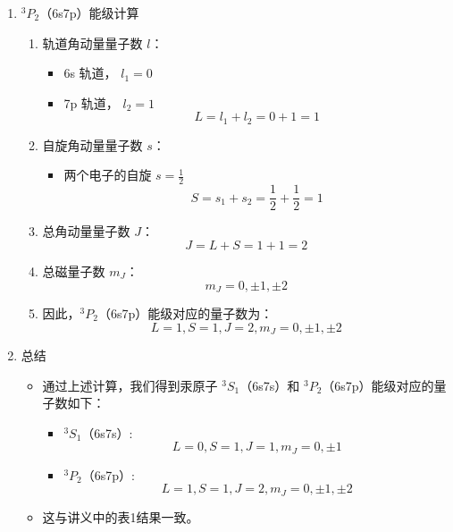 \documentclass[dvipsnames, svgnames,a4paper,11pt]{article}
\begin{document}
\begin{enumerate}
		\item \( ^3P_2 \)（6s7p）能级计算
		\begin{enumerate}
			\item 轨道角动量量子数 \( l \)：
			\begin{itemize}
				\item 6s 轨道， \( l_1 = 0 \)
				\item 7p 轨道， \( l_2 = 1 \)
				\[
				L = l_1 + l_2 = 0 + 1 = 1
				\]
			\end{itemize}
			
			\item 自旋角动量量子数 \( s \)：
			\begin{itemize}
				\item 两个电子的自旋 \( s = \frac{1}{2} \)
				\[
				S = s_1 + s_2 = \frac{1}{2} + \frac{1}{2} = 1
				\]
			\end{itemize}
			
			\item 总角动量量子数 \( J \)：
			\[
			J = L + S = 1 + 1 = 2
			\]
			
			\item 总磁量子数 \( m_J \)：
			\[
			m_J = 0, \pm 1, \pm 2
			\]
			
			\item 因此，\( ^3P_2 \)（6s7p）能级对应的量子数为：
			\[
			L = 1, S = 1, J = 2, m_J = 0, \pm 1, \pm 2
			\]
		\end{enumerate}
		
		\item 总结
		\begin{itemize}
			\item 通过上述计算，我们得到汞原子 \( ^3S_1 \)（6s7s）和 \( ^3P_2 \)（6s7p）能级对应的量子数如下：
			\begin{itemize}
				\item \( ^3S_1 \)（6s7s）:
				\[
				L = 0, S = 1, J = 1, m_J = 0, \pm 1
				\]
				
				\item \( ^3P_2 \)（6s7p）:
				\[
				L = 1, S = 1, J = 2, m_J = 0, \pm 1, \pm 2
				\]
			\end{itemize}
			
			\item 这与讲义中的表1结果一致。
		\end{itemize}
	\end{enumerate}
	
\end{document}

